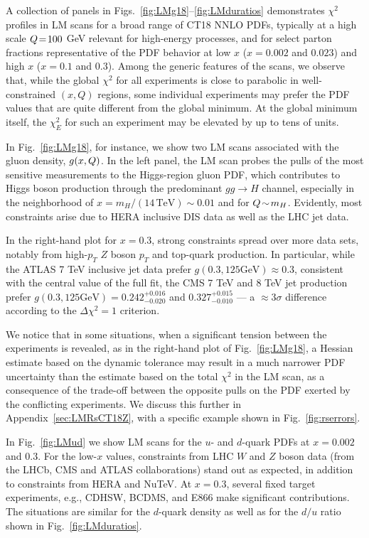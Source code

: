  A collection of panels
in Figs.~\ref{fig:LMg18}--\ref{fig:LMduratios}
demonstrates $\chi^2$ profiles in LM scans
for a broad range of CT18 NNLO PDFs, typically at a high scale $Q\!=\! 100$ GeV relevant for high-energy processes,
and for select parton fractions representative of the PDF
behavior at low $x$ ($x=0.002$ and $0.023$) and high $x$ ($x=0.1$ and
$0.3$). Among the generic features of the scans, we observe that,
while the global $\chi^2$ for all experiments is close to parabolic in
well-constrained $(x,Q)$ regions, some individual experiments may
prefer the PDF values that are quite different from the global
minimum. At the global minimum itself, the $\chi^2_E$ for such an
experiment may be elevated by up to tens of units.  

In Fig.~\ref{fig:LMg18}, for instance, we show two LM scans associated
with the gluon density, $g(x,Q)$. In the left panel, the LM scan probes the pulls of the most sensitive measurements to the Higgs-region gluon PDF, which
contributes to Higgs boson production through the predominant $gg \to
H$ channel, especially in the neighborhood of $x = m_H /
(14\,\mathrm{TeV})\!\sim\! 0.01$ and for $Q\!\sim\!m_H$. Evidently,
most constraints arise due to HERA inclusive DIS data as well as the
LHC jet data. 

In the right-hand plot for $x=0.3$, strong constraints spread over more data
sets, notably from high-$p_T$ $Z$ boson $p_T$ and top-quark
production. In particular, while the ATLAS 7 TeV inclusive jet data
prefer $g(0.3,125\mbox {GeV})\approx 0.3$, consistent with
the central value of the full fit, the CMS 7 TeV and 8 TeV jet
production prefer $g(0.3,125\mbox {GeV}) = 0.242^{+0.016}_{-0.020}$
and $0.327^{+0.015}_{-0.010}$ --- a $\approx 3\sigma$ difference
according to the $\Delta \chi^2=1$ criterion.

We notice that in some situations, when a significant tension
between the experiments is revealed, as in the right-hand plot of
Fig.~\ref{fig:LMg18}, a Hessian estimate based on the dynamic tolerance \cite{Martin:2009iq} may result in a much narrower PDF uncertainty
than the estimate based on the total $\chi^2$ in the LM scan, as a consequence of the trade-off between the opposite pulls on the PDF exerted by the conflicting experiments. We discuss this further in Appendix~\ref{sec:LMRsCT18Z}, with a specific example shown in Fig.~\ref{fig:rserrors}.

In Fig.~\ref{fig:LMud} we show LM scans for the $u$- and $d$-quark
PDFs at $x=0.002$ and $0.3$.
For the low-$x$ values, constraints from  LHC $W$ and $Z$ boson data 
(from the LHCb, CMS and ATLAS collaborations) stand out
as expected, in addition to constraints from HERA and NuTeV.
At $x=0.3$, several fixed target experiments, e.g., CDHSW, BCDMS, and
E866 make significant contributions.
The situations are similar for the $d$-quark density as well as for the $d/u$ ratio shown in Fig.~\ref{fig:LMduratios}.


